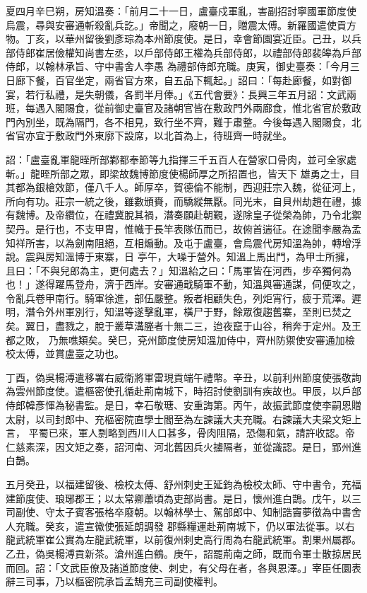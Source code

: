 \begin{pinyinscope}
 夏四月辛巳朔，房知溫奏：「前月二十一日，盧臺戍軍亂，害副招討寧國軍節度使烏震，尋與安審通斬殺亂兵訖。」帝聞之，廢朝一日，贈震太傅。新羅國遣使貢方物。丁亥，以華州留後劉彥琮為本州節度使。是日，幸會節園宴近臣。己丑，以兵部侍郎崔居儉權知尚書左丞，以戶部侍郎王權為兵部侍郎，以禮部侍郎裴皞為戶部侍郎，以翰林承旨、守中書舍人李愚
 為禮部侍郎充職。庚寅，御史臺奏：「今月三日廊下餐，百官坐定，兩省官方來，自五品下輒起。」詔曰：「每赴廊餐，如對御宴，若行私禮，是失朝儀，各罰半月俸。」《五代會要》：長興三年五月詔：文武兩班，每遇入閣賜食，從前御史臺官及諸朝官皆在敷政門外兩廊食，惟北省官於敷政門內別坐，既為隔門，各不相見，致行坐不齊，難于肅整。今後每遇入閣賜食，北省官亦宜于敷政門外東廓下設席，以北首為上，待班齊一時就坐。



 詔：「盧臺亂軍龍晊所部鄴都奉節等九指揮三千五百人在營家口骨肉，並可全家處斬。」龍晊所部之眾，即梁故魏博節度使楊師厚之所招置也，皆天下
 雄勇之士，目其都為銀槍效節，僅八千人。師厚卒，賀德倫不能制，西迎莊宗入魏，從征河上，所向有功。莊宗一統之後，雖數頒賚，而驕縱無厭。同光末，自貝州劫趙在禮，據有魏博。及帝纘位，在禮冀脫其禍，潛奏願赴朝覲，遂除皇子從榮為帥，乃令北禦契丹。是行也，不支甲胄，惟幟于長竿表隊伍而已，故俯首遄征。在途聞李嚴為孟知祥所害，以為劍南阻絕，互相煽動。及屯于盧臺，會烏震代房知溫為帥，轉增浮說。震與房知溫博于東寨，日
 亭午，大噪于營外。知溫上馬出門，為甲士所擁，且曰：「不與兒郎為主，更何處去？」知溫紿之曰：「馬軍皆在河西，步卒獨何為也！」遂得躍馬登舟，濟于西岸。安審通戢騎軍不動，知溫與審通謀，伺便攻之，令亂兵卷甲南行。騎軍徐進，部伍嚴整。叛者相顧失色，列炬宵行，疲于荒澤。遲明，潛令外州軍別行，知溫等遂擊亂軍，橫尸于野，餘眾復趨舊寨，至則已焚之矣。翼日，盡戮之，脫于叢草溝塍者十無二三，迨夜竄于山谷，稍奔于定州。及王都之敗，
 乃無噍類矣。癸巳，兗州節度使房知溫加侍中，齊州防禦使安審通加檢校太傅，並賞盧臺之功也。



 丁酉，偽吳楊溥遣移署右威衛將軍雷現貢端午禮幣。辛丑，以前利州節度使張敬詢為雲州節度使。遣樞密使孔循赴荊南城下，時招討使劉訓有疾故也。甲辰，以戶部侍郎韓彥惲為秘書監。是日，幸石敬瑭、安重誨第。丙午，故振武節度使李嗣恩贈太尉，以司封郎中、充樞密院直學士閻至為左諫議大夫充職。右諫議大夫梁文矩上言，
 平蜀已來，軍人剽略到西川人口甚多，骨肉阻隔，恐傷和氣，請許收認。帝仁慈素深，因文矩之奏，詔河南、河北舊因兵火擄隔者，並從識認。是日，郢州進白鵲。



 五月癸丑，以福建留後、檢校太傅、舒州刺史王延鈞為檢校太師、守中書令，充福建節度使、琅琊郡王；以太常卿蕭頃為吏部尚書。是日，懷州進白鵲。戊午，以三司副使、守太子賓客張格卒廢朝。以翰林學士、駕部郎中、知制誥竇夢徵為中書舍人充職。癸亥，遣宣徽使張延朗調發
 郡縣糧運赴荊南城下，仍以軍法從事。以右龍武統軍崔公實為左龍武統軍，以前復州刺史高行周為右龍武統軍。割果州屬郡。乙丑，偽吳楊溥貢新茶。滄州進白鶴。庚午，詔罷荊南之師，既而令軍士散掠居民而回。詔：「文武臣僚及諸道節度使、刺史，有父母在者，各與恩澤。」宰臣任圜表辭三司事，乃以樞密院承旨孟鵠充三司副使權判。




\end{pinyinscope}
